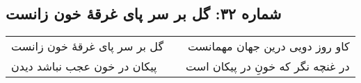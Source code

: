 \begin{center}
\section*{شماره ۳۲: گل بر سر پای غرقۀ خون زانست}
\label{sec:032}
\begin{longtable}{l p{0.5cm} r}
گل بر سر پای غرقهٔ خون زانست
&&
کاو روز دویی درین جهان مهمانست
\\
پیکان در خون عجب نباشد دیدن
&&
در غنچه نگر که خونِ در پیکان است
\\
\end{longtable}
\end{center}
